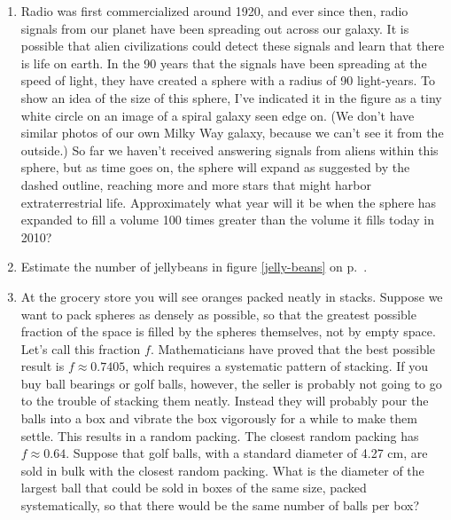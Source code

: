 \begin{enumerate}
\item 
Radio was first commercialized around 1920, and ever since then, radio signals from our
planet have been spreading out across our galaxy. It is possible that alien civilizations
could detect these signals and learn that there is life on earth. In the 90 years that
the signals have been spreading at the speed of light, they have created a sphere with a radius of 90 light-years.
To show an idea of the size of this sphere, I've indicated it in the figure as a tiny white circle on an image
of a spiral galaxy seen edge on. (We don't have similar photos of our own Milky Way galaxy, because we can't
see it from the outside.) So far we haven't received answering signals from aliens within this sphere,
but as time goes on, the sphere will expand as suggested by the dashed outline, reaching more and more stars that might harbor extraterrestrial
life. Approximately what year will it be when the sphere has expanded to fill a volume 100 times greater than
the volume it fills today in 2010?
\label{hw:seti-volume}


\vspace{1.5mm}

\item
Estimate the number of jellybeans in figure \ref{jelly-beans} on p.~\pageref{jelly-beans}.
\label{hw:jelly-beans}

\item 
At the grocery store you will see oranges packed neatly in stacks.
Suppose we want to pack spheres as densely as possible, so that the greatest
possible fraction of the space is filled by the spheres themselves, not
by empty space. Let's call this fraction $f$.
Mathematicians have proved that the best possible result is $f\approx 0.7405$,
which requires a systematic pattern of stacking. If you buy ball bearings or golf
balls, however, the seller is probably not going to go to the trouble of stacking
them neatly. Instead they will probably pour the balls into a box and vibrate the
box vigorously for a while to make them settle. This results in a random packing.
The closest random packing has $f\approx 0.64$.
Suppose that golf balls, with a standard diameter of 4.27 cm, are sold in bulk
with the closest random packing. What is the diameter of the largest ball that
could be sold in boxes of the same size, packed systematically, so that there
would be the same number of balls per box?


\end{enumerate}
